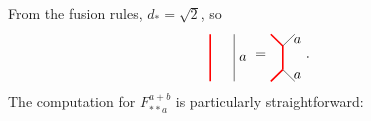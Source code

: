 From the fusion rules, $d_*=\sqrt{2}$, so
\begin{equation}
\label{eq:completeness2}
\begin{tikzpicture}[scale=1.2,baseline=(current bounding box.center)]
\draw[red,line width=0.4mm] (0,0) to (0,1);
\draw (0.5,0) to node [right] {$a$} (0.5,1);
\end{tikzpicture}=
\begin{tikzpicture}[scale=1.2,baseline=(current bounding box.center)]
\draw[red,line width=0.4mm] (0,0) to (0.25,0.25);
\draw (0.5,0) to node [right] {$a$} (0.25,0.25);
\draw[red,line width=0.4mm] (0,1) to (0.25,0.75);
\draw (0.5,1) to node [right] {$a$} (0.25,0.75);
\draw[red,line width=0.4mm] (0.25,0.25) to (0.25,0.75);
\end{tikzpicture}.
\end{equation}
The computation for $F_{**a}^{a+b}$ is particularly straightforward:
